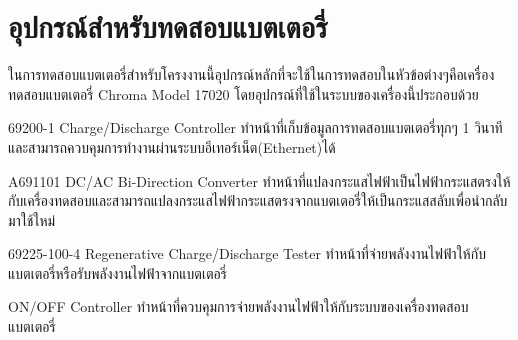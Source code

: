 \section{อุปกรณ์สำหรับทดสอบแบตเตอรี่}
ในการทดสอบแบตเตอรี่สำหรับโครงงานนี้อุปกรณ์หลักที่จะใช้ในการทดสอบในหัวข้อต่างๆคือเครื่องทดสอบแบตเตอรี่ Chroma Model 17020 โดยอุปกรณ์ที่ใช้ในระบบของเครื่องนี้ประกอบด้วย
\begin{enumerate}
{\item 69200-1 Charge/Discharge Controller \newline
ทำหน้าที่เก็บข้อมูลการทดสอบแบตเตอรี่ทุกๆ 1 วินาทีและสามารถควบคุมการทำงานผ่านระบบอีเทอร์เน็ต(Ethernet)ได้}
{\item A691101 DC/AC Bi-Direction Converter\newline
ทำหน้าที่แปลงกระแสไฟฟ้าเป็นไฟฟ้ากระแสตรงให้กับเครื่องทดสอบและสามารถแปลงกระแสไฟฟ้ากระแสตรงจากแบตเตอรี่ให้เป็นกระแสสลับเพื่อนำกลับมาใช้ใหม่}
{\item 69225-100-4 Regenerative Charge/Discharge Tester\newline
ทำหน้าที่จ่ายพลังงานไฟฟ้าให้กับแบตเตอรี่หรือรับพลังงานไฟฟ้าจากแบตเตอรี่}
{\item ON/OFF Controller\newline
ทำหน้าที่ควบคุมการจ่ายพลังงานไฟฟ้าให้กับระบบของเครื่องทดสอบแบตเตอรี่}
\end{enumerate}
